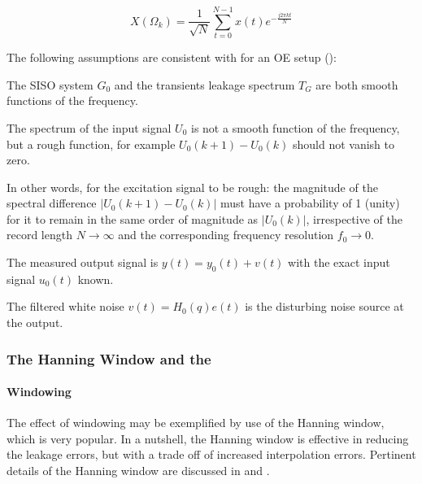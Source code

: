 \begin{equation}\label{eq:defDFT}
X(\Omega_k) = \frac{1}{\sqrt{N}}\sum_{t=0}^{N-1}x(t)e^{-\frac{j2\pi kt}{N}}
\end{equation}


The following assumptions are consistent with \citep{Schoukens2009LPM} for an OE setup ():
\begin{assumption}
The \gls{SISO} system $G_0$ and  the transients leakage spectrum $T_G$ are both smooth functions of the frequency.
\end{assumption}



\begin{assumption}

The spectrum of the  input signal $U_0$ is not a smooth function of the frequency, but a rough function, for example $U_0(k+1) - U_0(k)$ should not vanish to zero. %
\end{assumption}

In other words, for the excitation signal to be rough: the magnitude of the spectral difference $|U_0(k+1) - U_0(k)|$ must have a probability of 1 (unity) for it to remain in the same order of magnitude as $|U_0(k)|$, irrespective of the record length $N\rightarrow\infty$ and the corresponding  frequency resolution $f_0\rightarrow{0}$.


\begin{assumption}
The measured output signal is $y(t) = y_0(t) + v(t)$ with the exact input signal $u_0(t)$ known.
\end{assumption}


\begin{assumption}
The filtered white noise $v(t) = H_0(q)e(t)$ is the disturbing noise source at the output.
\end{assumption}


\subsubsection{The Hanning Window and the }\label{se:LPMFRFest}%
\paragraph{Windowing}
The effect of windowing may be  exemplified by use of the Hanning window, which is very popular.
In a nutshell, the Hanning window is effective in reducing  the leakage errors, but  with a trade off of increased interpolation errors. %
Pertinent details of the Hanning window are discussed in \citep{Schoukens2006LPM,Antoni2007FRF,Schoukens2009LPM,Wellstead1981} and \citep{Harris1978}.

